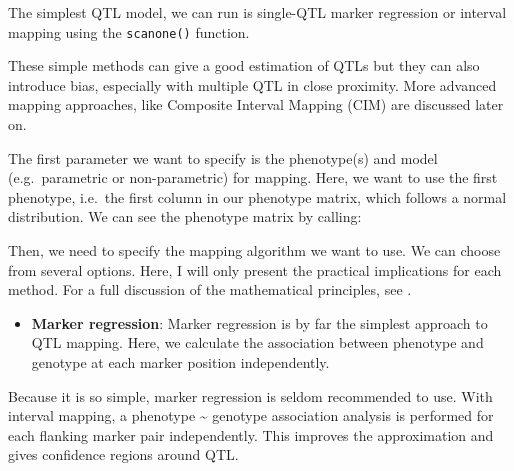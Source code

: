 \documentclass[12pt,]{krantz}
\newenvironment{Shaded}{\begin{snugshade}}{\end{snugshade}}
\newcommand{\OperatorTok}[1]{\textcolor[rgb]{0.81,0.36,0.00}{\textbf{#1}}}
\newcommand{\NormalTok}[1]{#1}
\providecommand{\tightlist}{%
  \setlength{\itemsep}{0pt}\setlength{\parskip}{0pt}}
\theoremstyle{definition}
\theoremstyle{definition}
\theoremstyle{definition}
\theoremstyle{remark}
\begin{document}
The simplest QTL model, we can run is single-QTL marker regression or
interval mapping using the \texttt{scanone()} function.

These simple methods can give a good estimation of QTLs but they can
also introduce bias, especially with multiple QTL in close proximity.
More advanced mapping approaches, like Composite Interval Mapping (CIM)
are discussed later on.

The first parameter we want to specify is the phenotype(s) and model
(e.g.~parametric or non-parametric) for mapping. Here, we want to use
the first phenotype, i.e.~the first column in our phenotype matrix,
which follows a normal distribution. We can see the phenotype matrix by
calling:

\begin{Shaded}
\end{Shaded}

Then, we need to specify the mapping algorithm we want to use. We can
choose from several options. Here, I will only present the practical
implications for each method. For a full discussion of the mathematical
principles, see \citet{lynch1998genetics}.

\begin{itemize}
\tightlist
\item
  \textbf{Marker regression}: Marker regression is by far the simplest
  approach to QTL mapping. Here, we calculate the association between
  phenotype and genotype at each marker position independently.
\end{itemize}

Because it is so simple, marker regression is seldom recommended to use.
With interval mapping, a phenotype \textasciitilde{} genotype
association analysis is performed for each flanking marker pair
independently. This improves the approximation and gives confidence
regions around QTL.
\end{document}
